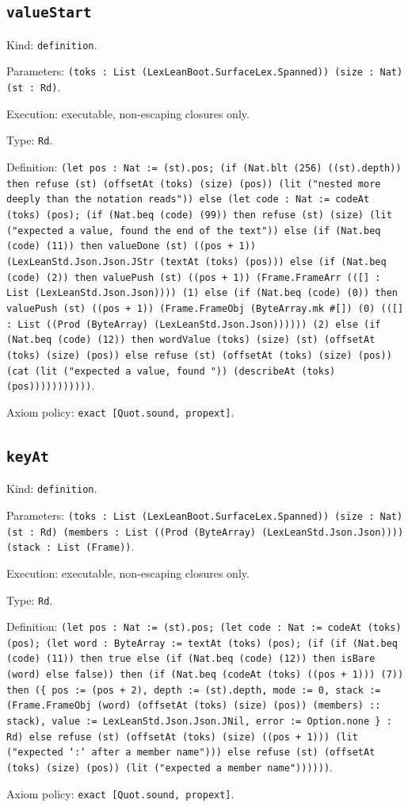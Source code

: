 \documentclass[11pt]{article}
\begin{document}
\subsection*{\texttt{valueStart}}
\noindent Kind: \texttt{definition}.\par
\noindent Parameters: \texttt{(toks : List (LexLeanBoot.SurfaceLex.Spanned)) (size : Nat) (st : Rd)}.\par
\noindent Execution: executable, non-escaping closures only.\par
\noindent Type: \texttt{Rd}.\par
\noindent Definition: \texttt{(let pos : Nat := (st).pos; (if (Nat.blt (256) ((st).depth)) then refuse (st) (offsetAt (toks) (size) (pos)) (lit ("nested more deeply than the notation reads")) else (let code : Nat := codeAt (toks) (pos); (if (Nat.beq (code) (99)) then refuse (st) (size) (lit ("expected a value, found the end of the text")) else (if (Nat.beq (code) (11)) then valueDone (st) ((pos + 1)) (LexLeanStd.Json.Json.JStr (textAt (toks) (pos))) else (if (Nat.beq (code) (2)) then valuePush (st) ((pos + 1)) (Frame.FrameArr (([] : List (LexLeanStd.Json.Json)))) (1) else (if (Nat.beq (code) (0)) then valuePush (st) ((pos + 1)) (Frame.FrameObj (ByteArray.mk \#[]) (0) (([] : List ((Prod (ByteArray) (LexLeanStd.Json.Json)))))) (2) else (if (Nat.beq (code) (12)) then wordValue (toks) (size) (st) (offsetAt (toks) (size) (pos)) else refuse (st) (offsetAt (toks) (size) (pos)) (cat (lit ("expected a value, found ")) (describeAt (toks) (pos)))))))))))}.\par
\noindent Axiom policy: \texttt{exact [Quot.sound, propext]}.\par
\subsection*{\texttt{keyAt}}
\noindent Kind: \texttt{definition}.\par
\noindent Parameters: \texttt{(toks : List (LexLeanBoot.SurfaceLex.Spanned)) (size : Nat) (st : Rd) (members : List ((Prod (ByteArray) (LexLeanStd.Json.Json)))) (stack : List (Frame))}.\par
\noindent Execution: executable, non-escaping closures only.\par
\noindent Type: \texttt{Rd}.\par
\noindent Definition: \texttt{(let pos : Nat := (st).pos; (let code : Nat := codeAt (toks) (pos); (let word : ByteArray := textAt (toks) (pos); (if (if (Nat.beq (code) (11)) then true else (if (Nat.beq (code) (12)) then isBare (word) else false)) then (if (Nat.beq (codeAt (toks) ((pos + 1))) (7)) then (\{ pos := (pos + 2), depth := (st).depth, mode := 0, stack := (Frame.FrameObj (word) (offsetAt (toks) (size) (pos)) (members) :: stack), value := LexLeanStd.Json.Json.JNil, error := Option.none \} : Rd) else refuse (st) (offsetAt (toks) (size) ((pos + 1))) (lit ("expected `:` after a member name"))) else refuse (st) (offsetAt (toks) (size) (pos)) (lit ("expected a member name"))))))}.\par
\noindent Axiom policy: \texttt{exact [Quot.sound, propext]}.\par
\end{document}
